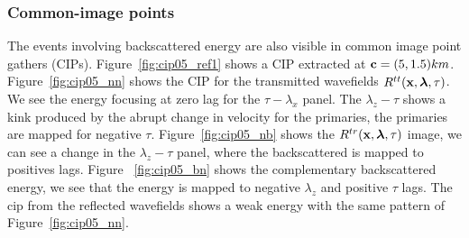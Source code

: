 \subsubsection{Common-image points}

The events involving backscattered energy are also visible in common image point gathers (CIPs).
%
Figure~\ref{fig:cip05_ref1} shows a CIP extracted at ${\bf c}=(5,1.5)km$.
Figure~\ref{fig:cip05_nn} shows the CIP for the transmitted wavefields $R^{tt}({\bf x},{\boldsymbol{\lambda}},\tau)$. We see the energy focusing at zero lag 
for the $\tau-\lambda_x$ panel. The $\lambda_z-\tau$ shows a kink produced by the abrupt change in velocity for the primaries, the primaries
are mapped for negative $\tau$.  Figure~\ref{fig:cip05_nb}
 shows the $R^{tr}({\bf x},{\boldsymbol{\lambda}},\tau)$ image, we can see a change in the $\lambda_z-\tau$ panel, where the backscattered is mapped to positives lags. Figure
~\ref{fig:cip05_bn} shows the complementary backscattered energy, we see that the energy is mapped to negative $\lambda_z$ and positive $\tau$ lags.
The cip from the reflected wavefields shows a weak energy with the same pattern of Figure~\ref{fig:cip05_nn}.






